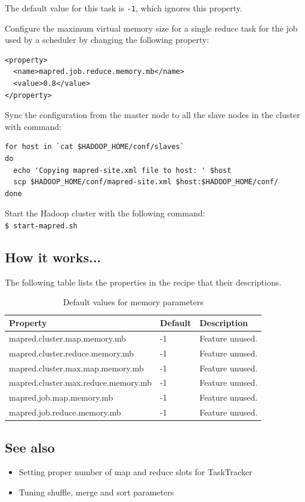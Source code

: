 The default value for this task is \verb|-1|, which ignores this property.

Configure the maximum virtual memory size for a single reduce task for the job used by a scheduler by changing the following property:
\lstset{style=bashstyle}
\begin{lstlisting}
<property>
  <name>mapred.job.reduce.memory.mb</name>
  <value>0.8</value>
</property>
\end{lstlisting}

Sync the configuration from the master node to all the slave nodes in the cluster with command:
\lstset{style=bashstyle}
\begin{lstlisting}
for host in `cat $HADOOP_HOME/conf/slaves`
do
  echo 'Copying mapred-site.xml file to host: ' $host
  scp $HADOOP_HOME/conf/mapred-site.xml $host:$HADOOP_HOME/conf/
done
\end{lstlisting}

Start the Hadoop cluster with the following command: \\
\verb|$ start-mapred.sh|

\subsection*{How it works...}
The following table lists the properties in the recipe that their descriptions.
\begin{table}[ht]
  \centering
  \begin{tabular}{lll}
    \toprule
    \textbf{Property} &  \textbf{Default} &  \textbf{Description} \\ \midrule
      mapred.cluster.map.memory.mb & -1 & Feature unused. \\
      mapred.cluster.reduce.memory.mb & -1 & Feature unused. \\
      mapred.cluster.max.map.memory.mb & -1 & Feature unused. \\
      mapred.cluster.max.reduce.memory.mb & -1 & Feature unused. \\
      mapred.job.map.memory.mb & -1 & Feature unused. \\
      mapred.job.reduce.memory.mb & -1 & Feature unused. \\ \bottomrule
  \end{tabular}
  \caption{Default values for memory parameters}\label{tbl:memoryconfig.default}
\end{table}

\subsection*{See also}
\begin{itemize}
  \item Setting proper number of map and reduce slots for TaskTracker
  \item Tuning shuffle, merge and sort parameters
\end{itemize}

